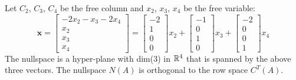 \begin{enumerate}[label={(\arabic*)}]
\begin{itemize}
        Let \(C_2\), \(C_3\), \(C_4\) be the free column and \(x_2\), \(x_3\), \(x_4\) be the free variable: \[\textbf{x} = \begin{bmatrix} -2x_2 - x_3 - 2x_4 \\ x_2 \\ x_3 \\ x_4 \end{bmatrix} = \begin{bmatrix} -2 \\ 1 \\ 0 \\ 0\end{bmatrix}x_2 + \begin{bmatrix} -1 \\ 0 \\ 1 \\ 0\end{bmatrix}x_3 + \begin{bmatrix} -2 \\ 0 \\ 0 \\ 1\end{bmatrix}x_4 \]
        The nullspace is a hyper-plane with dim(3) in \(\mathbb{R}^4\) that is spanned by the above three vectors. The nullspace \(N(A)\) is orthogonal to the row space \(C^T(A)\). 
    \end{itemize}
    
    
    

\end{enumerate}
